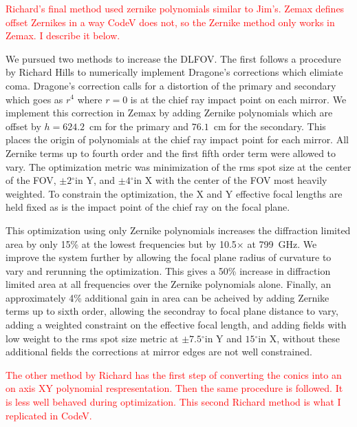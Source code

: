 \documentclass[]{spie}  %
\newcommand{\comr}[1]{\textcolor{red}{#1}}
\newcommand{\dgr}{$^\circ$}
\begin{document}

\comr{Richard's final method used zernike polynomials similar to Jim's. Zemax defines offset Zernikes in a way CodeV does not, so the 
Zernike method only works in Zemax.  I describe it below.}

We pursued two methods to increase the DLFOV.  The first follows a procedure by Richard Hills to numerically implement 
Dragone's corrections which elimiate coma.\cite{dragone_coma} Dragone's correction calls for a distortion of the primary and secondary 
which goes as $r^4$ where $r=0$ is at the chief ray impact point on each mirror.  We implement this correction in Zemax by adding Zernike 
polynomials which are offset by $h=624.2$~cm for the primary and $76.1$~cm for the secondary.  This places the origin of polynomials at the 
chief ray impact point for each mirror. All Zernike terms up to fourth order and the first fifth order term were allowed to vary. 
The optimization metric was minimization of the rms spot size at the center of the FOV, $\pm2$\dgr in Y, and $\pm4$\dgr in X with the 
center of the FOV most heavily weighted. 
To constrain the optimization, the X and Y effective focal lengths are held fixed as is the impact point of the chief ray on the focal plane. 

This optimization using only Zernike polynomials increases the diffraction limited area by only 15\% at the lowest frequencies but by 
10.5$\times$ at 799~GHz.  We improve the system further by allowing the focal plane radius of curvature to vary and rerunning the optimization.  
This gives a 50\% increase in diffraction limited area at all frequencies over the Zernike polynomials alone.  
Finally, an approximately 4\% additional gain in area can be acheived by adding Zernike terms 
up to sixth order, allowing the secondray to focal plane distance to vary, adding a weighted constraint on the effective focal length, 
and adding fields with low weight to the rms spot size metric at $\pm7.5$\dgr in Y and $15$\dgr in X, without these additional fields the 
corrections at mirror edges are not well constrained.

\comr{The other method by Richard has the first step of converting the conics into an on axis XY polynomial respresentation. Then the same procedure is followed.  It is less well behaved during optimization.  This second Richard method is what I replicated in CodeV.}

\end{document}
